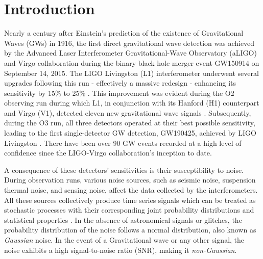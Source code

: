 \documentclass[12pt]{article}
\begin{document}
\section{Introduction}\label{Introduction}

\noindent Nearly a century after Einstein's prediction of the existence of Gravitational Waves (GWs) in 1916, the first direct gravitational wave detection was achieved by the Advanced Laser Interferometer Gravitational-Wave Observatory (aLIGO) and Virgo collaboration during the binary black hole merger event GW150914 on September 14, 2015. The LIGO Livingston (L1) interferometer underwent several upgrades following this run - effectively a massive redesign - enhancing its sensitivity by 15\% to 25\% \cite{grant_advanced_2016}. This improvement was evident during the O2 observing run during which L1, in conjunction with its Hanford (H1) counterpart and Virgo (V1), detected eleven new gravitational wave signals \cite{collaboration_gwtc-1_2019}. Subsequently, during the O3 run, all three detectors operated at their best possible sensitivity, leading to the first single-detector GW detection, GW190425, achieved by LIGO Livingston \cite{abbott_gwtc-2_2021}. There have been over 90 GW events recorded at a high level of confidence since the LIGO-Virgo collaboration's inception to date.

\medskip
\noindent A consequence of these detectors' sensitivities is their susceptibility to noise. During observation runs, various noise sources, such as seismic noise, suspension thermal noise, and sensing noise, affect the data collected by the interferometers. All these sources collectively produce time series signals which can be treated as stochastic processes with their corresponding joint probability distributions and statistical properties \cite{collaboration_guide_2020}. In the absence of astronomical signals or glitches, the probability distribution of the noise follows a normal distribution, also known as \textit{Gaussian} noise. In the event of a Gravitational wave or any other signal, the noise exhibits a high signal-to-noise ratio (SNR), making it \textit{non-Gaussian}.
\end{document}
